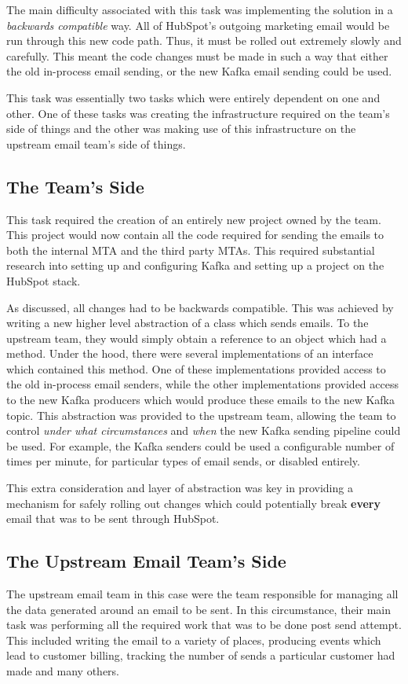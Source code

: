 The main difficulty associated with this task was implementing the solution in a \textit{backwards compatible} way. All of HubSpot's outgoing marketing email would be run through this new code path. Thus, it must be rolled out extremely slowly and carefully. This meant the code changes must be made in such a way that either the old in-process email sending, or the new Kafka email sending could be used. 

This task was essentially two tasks which were entirely dependent on one and other. One of these tasks was creating the infrastructure required on the \team{} team's side of things and the other was making use of this infrastructure on the upstream email team's side of things.
\break

\subsection{The \team{} Team's Side}
This task required the creation of an entirely new project owned by the \team{} team. This project would now contain all the code required for sending the emails to both the internal MTA and the third party MTAs. This required substantial research into setting up and configuring Kafka and setting up a project on the HubSpot stack. 

As discussed, all changes had to be backwards compatible. This was achieved by writing a new higher level abstraction of a class which sends emails. To the upstream team, they would simply obtain a reference to an object which had a  method. Under the hood, there were several implementations of an interface which contained this method. One of these implementations provided access to the old in-process email senders, while the other implementations provided access to the new Kafka producers which would produce these emails to the new Kafka topic. This abstraction was provided to the upstream team, allowing the \team{} team to control \textit{under what circumstances} and \textit{when} the new Kafka sending pipeline could be used. For example, the Kafka senders could be used a configurable number of times per minute, for particular types of email sends, or disabled entirely.

This extra consideration and layer of abstraction was key in providing a mechanism for safely rolling out changes which could potentially break \textbf{every} email that was to be sent through HubSpot.

\subsection{The Upstream Email Team's Side}
The upstream email team in this case were the team responsible for managing all the data generated around an email to be sent. In this circumstance, their main task was performing all the required work that was to be done post send attempt. This included writing the email to a variety of places, producing events which lead to customer billing, tracking the number of sends a particular customer had made and many others. 

